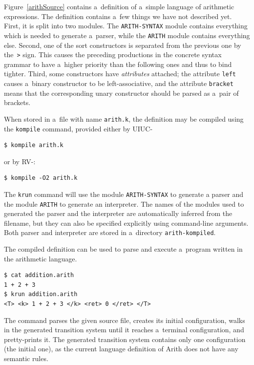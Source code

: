 \documentclass[nolot,nolof,nocover,printed]{fithesis3}
\newcommand{\krun}{\texttt{krun}\xspace}
\newcommand{\kompile}{\texttt{kompile}\xspace}
\begin{document}
Figure~\ref{arithSource} contains a~definition of a~simple language of arithmetic expressions. The definition contains a~few things we have not described yet. First, it is split into two modules. The \texttt{ARITH-SYNTAX} module contains everything which is needed to generate a~parser, while the \texttt{ARITH} module contains everything else. Second, one of the sort constructors is separated from the previous one by the~\lstinline|>| sign. This causes the preceding productions in the concrete syntax grammar to have a~higher priority than the following ones and thus to bind tighter. Third, some constructors have \textit{attributes} attached; the attribute \texttt{left} causes a~binary constructor to be left-associative, and the attribute \texttt{bracket} means that the corresponding unary constructor should be parsed as a~pair of brackets.

When stored in a~file with name \texttt{arith.k}, the definition may be compiled using the \kompile command, provided either by UIUC-\K
\begin{lstlisting}
$ kompile arith.k
\end{lstlisting}
or by RV-\K:
\begin{lstlisting}
$ kompile -O2 arith.k
\end{lstlisting}
The \krun command will use the module \texttt{ARITH-SYNTAX} to generate a parser and the module \texttt{ARITH} to generate an interpreter. The names of the modules used to generated the parser and the interpreter are automatically inferred from the filename, but they can also be specified explicitly using command-line arguments. Both parser and interpreter are stored in a~directory \texttt{arith-kompiled}.

The compiled definition can be used to parse and execute a~program written in the arithmetic language.
\begin{lstlisting}
$ cat addition.arith
1 + 2 + 3
$ krun addition.arith
<T> <k> 1 + 2 + 3 </k> <ret> 0 </ret> </T>
\end{lstlisting}
The command parses the given source file, creates its initial configuration, walks in the generated transition system until it reaches a~terminal configuration, and pretty-prints it. The generated transition system contains only one configuration (the initial one), as the current language definition of Arith does not have any semantic rules.
\end{document}
